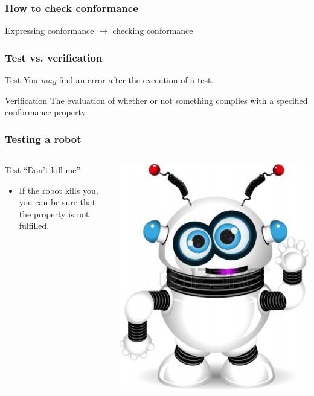 \documentclass{beamer}
\begin{document}
\begin{frame}
\frametitle{How to check conformance}

\Large{Expressing conformance $\xrightarrow{\ }$ checking conformance}

\end{frame}

\begin{frame}
\frametitle{Test vs. verification}
\begin{block}{Test}
You \textit{may} find an error after the execution of a test.
\end{block}
\begin{block}{Verification}
The evaluation of whether or not something complies with a
specified conformance property
\end{block}
\end{frame}

\begin{frame}
\frametitle{Testing a robot}

    \begin{columns}[c] %
    \begin{block}{Test \color{red}``Don't kill me''}
    \begin{itemize}
      \item If the robot kills you, you can be sure that the property is not fulfilled.
    \end{itemize}
    \end{block}
    \includegraphics[width=\textwidth]{../img/robot}
    \end{columns}
\end{frame}
\end{document}
